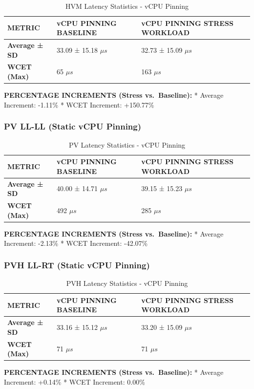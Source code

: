 \begin{table}
\centering
\caption{HVM Latency Statistics - vCPU Pinning}
\begin{tabularx}{\linewidth}{@{}YYY@{}}
\toprule
METRIC & vCPU PINNING BASELINE & vCPU PINNING STRESS WORKLOAD\tabularnewline
\midrule
\textbf{Average ± SD} & 33.09 ± 15.18 $\mu s$ & 32.73 ± 15.09 $\mu s$\tabularnewline
\textbf{WCET (Max)} & 65 $\mu s$ & 163 $\mu s$\tabularnewline
\bottomrule
\end{tabularx}
\end{table}

\textbf{PERCENTAGE INCREMENTS (Stress vs.~Baseline):} * Average
Increment: -1.11\% * WCET Increment: +150.77\%

\subsubsection{PV LL-LL (Static vCPU
Pinning)}\label{pv-ll-ll-static-vcpu-pinning}

\begin{table}
\centering
\caption{PV Latency Statistics - vCPU Pinning}
\begin{tabularx}{\linewidth}{@{}YYY@{}}
\toprule
METRIC & vCPU PINNING BASELINE & vCPU PINNING STRESS WORKLOAD\tabularnewline
\midrule
\textbf{Average ± SD} & 40.00 ± 14.71 $\mu s$ & 39.15 ± 15.23 $\mu s$\tabularnewline
\textbf{WCET (Max)} & 492 $\mu s$ & 285 $\mu s$\tabularnewline
\bottomrule
\end{tabularx}
\end{table}

\textbf{PERCENTAGE INCREMENTS (Stress vs.~Baseline):} * Average
Increment: -2.13\% * WCET Increment: -42.07\%

\subsubsection{PVH LL-RT (Static vCPU
Pinning)}\label{pvh-ll-rt-static-vcpu-pinning}

\begin{table}
\centering
\caption{PVH Latency Statistics - vCPU Pinning}
\begin{tabularx}{\linewidth}{@{}YYY@{}}
\toprule
METRIC & vCPU PINNING BASELINE & vCPU PINNING STRESS WORKLOAD\tabularnewline
\midrule
\textbf{Average ± SD} & 33.16 ± 15.12 $\mu s$ & 33.20 ± 15.09 $\mu s$\tabularnewline
\textbf{WCET (Max)} & 71 $\mu s$ & 71 $\mu s$\tabularnewline
\bottomrule
\end{tabularx}
\end{table}

\textbf{PERCENTAGE INCREMENTS (Stress vs.~Baseline):} * Average
Increment: +0.14\% * WCET Increment: 0.00\%
